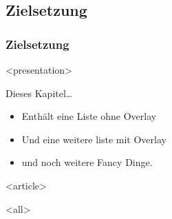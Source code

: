 \subsection{Zielsetzung}
{%
\begin{frame}[fragile,t]
\frametitle<presentation>{Zielsetzung}


\mode
<presentation>

	Dieses Kapitel\dots{}
\begin{itemize}
	\item Enthält eine Liste ohne Overlay
	\item Und eine weitere liste mit Overlay
	\item und noch weitere Fancy Dinge.
\end{itemize}


\mode
<article>


\mode
<all>


\end{frame}
}

\newpage
